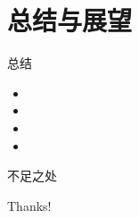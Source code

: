 \documentclass{beamer}
\begin{document}
\section{总结与展望}
\begin{frame}{总结}
    \begin{itemize}
        \item 
        \item 
        \item 
        \item 
    \end{itemize}
\end{frame}
\begin{frame}{不足之处}
   \cite{origin}
\end{frame}


\begin{frame}

\nocite{*}
\printbibliography[title={参考文献}]
\end{frame}

\begin{frame}
    \begin{center}
        {\Huge\calligra Thanks!}
    \end{center}
\end{frame}
\end{document}

